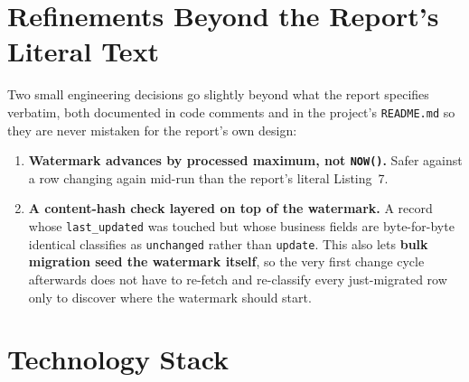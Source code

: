 \documentclass[11pt,a4paper]{article}
\begin{document}
\section{Refinements Beyond the Report's Literal Text}
\label{sec:refinements}

Two small engineering decisions go slightly beyond what the report specifies verbatim, both
documented in code comments and in the project's \texttt{README.md} so they are never mistaken
for the report's own design:

\begin{enumerate}[leftmargin=1.4em]
    \item \textbf{Watermark advances by processed maximum, not \texttt{NOW()}.} Safer against a
          row changing again mid-run than the report's literal Listing~7.
    \item \textbf{A content-hash check layered on top of the watermark.} A record whose
          \texttt{last\_updated} was touched but whose business fields are byte-for-byte
          identical classifies as \texttt{unchanged} rather than \texttt{update}. This also lets
          \textbf{bulk migration seed the watermark itself}, so the very first change cycle
          afterwards does not have to re-fetch and re-classify every just-migrated row only to
          discover where the watermark should start.
\end{enumerate}

\section{Technology Stack}
\end{document}
